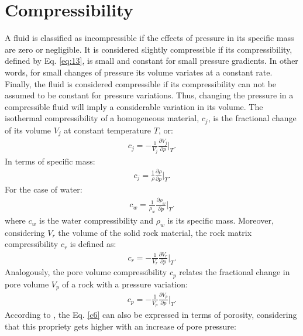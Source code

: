 \section{Compressibility}
A fluid is classified as incompressible if the effects of pressure in its specific mass are zero or negligible. It is considered slightly compressible if its compressibility, defined by Eq. \ref{eq:13}, is small and constant for small pressure gradients. In other words, for small changes of pressure its volume variates at a constant rate. Finally, the fluid is considered compressible if its compressibility can not be assumed to be constant for pressure variations. Thus, changing the pressure in a compressible fluid will imply a considerable variation in its volume. The isothermal compressibility of a homogeneous material, $c_j$, is the fractional change of its volume $V_j$ at constant temperature $T$, or:
	\begin{align}
	\label{eq:13}
	c_j=-\frac{1}{V_j} \frac{\partial V_j}{\partial p} \bigg|_T .
	\end{align}
In terms of specific mass:
	\begin{align}
	\label{eq:14}
	c_j=\frac{1}{\rho} \frac{\partial \rho}{\partial p} \bigg|_T.
	\end{align}
For the case of water:
	\begin{align}
	\label{c4}
	c_w=\frac{1}{\rho_w} \frac{\partial \rho_w}{\partial p} \bigg|_T.
	\end{align}
where $c_w$ is the water compressibility and $\rho_w$ is its specific mass. Moreover, considering $V_r$ the volume of the solid rock material, the rock matrix compressibility $c_r$ is defined as:
	\begin{align}
	\label{c5}
	c_r=-\frac{1}{V_r} \frac{\partial V_r}{\partial p} \bigg|_T .
	\end{align}
Analogously, the pore volume compressibility $c_p$ relates the fractional change in pore volume $V_p$ of a rock with a pressure variation:
	\begin{align}
	\label{c6}
	c_p=-\frac{1}{V_p} \frac{\partial V_p}{\partial p} \bigg|_T .
	\end{align}
According to \cite{Ahmed1946}, the Eq. \ref{c6} can also be expressed in terms of porosity, considering that this propriety gets higher with an increase of pore pressure:
